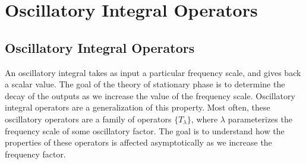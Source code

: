 \chapter{Oscillatory Integral Operators}

\section{Oscillatory Integral Operators}

An oscillatory integral takes as input a particular frequency scale, and gives back a scalar value. The goal of the theory of stationary phase is to determine the decay of the outputs as we increase the value of the frequency scale. Oscillatory integral operators are a generalization of this property. Most often, these oscillatory operators are a family of operators $\{ T_\lambda \}$, where $\lambda$ parameterizes the frequency scale of some oscillatory factor. The goal is to understand how the properties of these operators is affected asymptotically as we increase the frequency factor.

